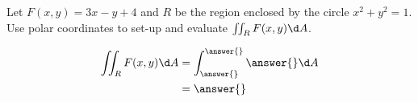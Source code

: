 \documentclass{ximera}
\author{Gregory Hartman \and Bart Snapp}
\begin{document}
\begin{exercise}
  Let $F(x,y) = 3x-y+4$ and $R$ be the region enclosed by the circle
  $x^2+y^2=1$. Use polar coordinates to set-up and evaluate $\iint_R
  F(x,y) \d A$.
  \begin{prompt}
  \begin{align*}
    \iint_R F(x,y) \d A &= \int_{\answer{}}^{\answer{}} \answer{} \d A\\
    &= \answer{}
  \end{align*}
  \end{prompt}
\end{exercise}
\end{document}
